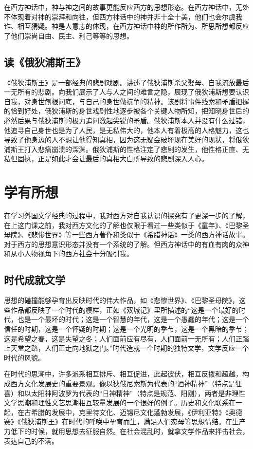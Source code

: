 \documentclass[AutoFakeBold]{LZUThesis}
\begin{document}
在西方神话中，神与神之间的故事更能反应西方的思想形态。在西方神话中，无处不体现着对神的崇拜和向往，但西方神话中的神并非十全十美，他们也会尔虞我诈、相互猜疑。神是人意志的体现，在西方神话中神的所作所为、所思所想都反应了他们崇尚自由、民主、利己等等的思想。

\section{读《俄狄浦斯王》}

《俄狄浦斯王》是一部经典的悲剧戏剧。讲述了俄狄浦斯杀父娶母、自我流放最后一无所有的悲剧。向我们展示了人与人之间的难言之隐，展现了俄狄浦斯想要认识自我，对身世刨根问底，与自己的身世做抗争的精神。该剧将事件线索和矛盾把握的恰到好处，俄狄浦斯的身世戏剧性地逐步被各个关键人物所知，把知晓身世后的必然后果与俄狄浦斯的极力追问激起尖锐的矛盾。俄狄浦斯本人并没有什么过错，他追寻自己身世也是为了人民，是无私伟大的，他本人有着极高的人格魅力，这也导致了他身边的人不想让他得知真相，因为这无疑会破坏现在美好的现状，将俄狄浦斯王打入悲痛崩溃的深渊。俄狄浦斯的性格注定了悲剧的发生，他性格正直、无私但固执，正是如此才会让最后的真相大白所导致的悲剧深入人心。

\chapter{学有所想}
在学习外国文学经典的过程中，我对西方对自我认识的探究有了更深一步的了解，在上这门课之前，我对西方文化的了解也仅限于看过一些类似于《童年》、《巴黎圣母院》、《悲惨世界》等一些西方著作和类似于《希腊神话》一类的西方神话故事。对于西方的思想意识形态并没有一个系统的了解。但西方神话中的有血有肉的众神和从小人物视角下的西方社会十分吸引我。


\section{时代成就文学}
思想的碰撞能够孕育出反映时代的伟大作品，如《悲惨世界》、《巴黎圣母院》，这些作品都反映了一个时代的模样，正如《双城记》里所描述的“这是一个最好的时代，也是一个最坏的时代；这是一个智慧的年代，这是一个愚蠢的年代；这是一个信任的时期，这是一个怀疑的时期；这是一个光明的季节，这是一个黑暗的季节；这是希望之春，这是失望之冬；人们面前应有尽有，人们面前一无所有；人们正踏上天堂之路，人们正走向地狱之门。”时代造就一个时期的独特文学，文学反应一个时代的风貌。

在时代的思潮中，许多派系相互排斥、相互促进，此起彼伏，相互反拨和超越，构成西方文化发展史的重要景观。像以狄俄尼索斯为代表的“酒神精神”（特点是狂喜）和以太阳神阿波罗为代表的“日神精神”（特点是规范、阳刚），两者是非理性文学思潮和理性文艺思潮相互较量发展的一个很好的例子。历史和文化联系在一起，在古希腊的发展中，克里特文化、迈锡尼文化蓬勃发展，《伊利亚特》《奥德赛》《俄狄浦斯王》在时代的呼唤中孕育而生，满足人们恋母等思想情结。在生产力低下的时候，就用思想去征服自然。在社会混乱时，就拿文学作品来抨击社会，表达自己的不满。
\end{document}
